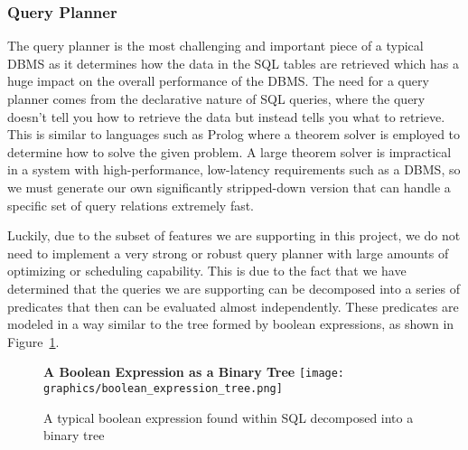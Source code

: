 \documentclass[letterpaper, 12pt]{article}
\begin{document}
\subsubsection{Query Planner}
The query planner is the most challenging and important piece of a typical DBMS as it
determines how the data in the SQL tables are retrieved which has a huge impact on
the overall performance of the DBMS. The need for a query planner comes from the
declarative nature of SQL queries, where the query doesn't tell you how to retrieve the
data but instead tells you what to retrieve. This is similar to languages such as Prolog where
a theorem solver is employed to determine how to solve the given problem. A large theorem
solver is impractical in a system with high-performance, low-latency requirements such as
a DBMS, so we must generate our own significantly stripped-down version that can handle a
specific set of query relations extremely fast.
\par\vspace{\baselineskip}
Luckily, due to the subset of features we are supporting in this project, we do not need to
implement a very strong or robust query planner with large amounts of optimizing or scheduling
capability. This is due to the fact that we have determined that the queries we are supporting
can be decomposed into a series of predicates that then can be evaluated almost independently.
These predicates are modeled in a way similar to the tree formed by boolean expressions, as shown
in Figure~\ref{fig:bool_expr_tree}.
\par\vspace{\baselineskip}

\begin{figure}[H]
 \centering
 \textbf{A Boolean Expression as a Binary Tree}
 \texttt{[image: graphics/boolean\_expression\_tree.png]}
 \caption{A typical boolean expression found within SQL decomposed into a binary tree}
 \label{fig:bool_expr_tree}
\end{figure}
\end{document}
